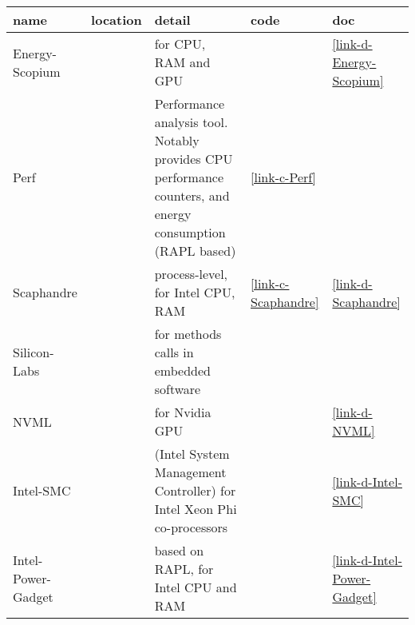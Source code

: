 \begin{tabular}{|>{\raggedright\arraybackslash}p{3.25cm}|p{1.25cm}|p{6.7cm}|p{1.5cm}|p{1.5cm}|}
\toprule
name & location & detail & code & doc \\
\midrule
Energy-Scopium & \cite{jay2023} & for CPU, RAM and GPU &  &  \href{https://www.denergium.fr/pages/the-energyscopium-software-suite.html}{\ref*{link-d-Energy-Scopium}} \\
Perf & \cite{jay2023} & Performance analysis tool. Notably provides CPU performance counters, and energy consumption (RAPL based) &  \href{https://www.man7.org/linux/man-pages/man1/perf.1.html}{\ref*{link-c-Perf}} &  \\
Scaphandre & \cite{jay2023} & process-level, for Intel CPU, RAM &  \href{https://github.com/hubblo-org/scaphandre}{\ref*{link-c-Scaphandre}} &  \href{https://hubblo-org.github.io/scaphandre-documentation/}{\ref*{link-d-Scaphandre}} \\
Silicon-Labs & \cite{rieger2017} & for methods calls in embedded software &  &  \\
NVML & \cite{fahad2019} & for Nvidia GPU &  &  \href{https://developer.nvidia.com/nvidia-system-management-interface}{\ref*{link-d-NVML}} \\
Intel-SMC & \cite{fahad2019} & (Intel System Management Controller) for Intel Xeon Phi co-processors &  &  \href{https://www.intel.com/content/dam/develop/external/us/en/documents/xeon-phi-coprocessor-system-software-developers-guide.pdf}{\ref*{link-d-Intel-SMC}} \\
Intel-Power-Gadget & \cite{garcia-martin2019a} & based on RAPL, for Intel CPU and RAM &  &  \href{https://www.intel.com/content/www/us/en/developer/articles/tool/power-gadget.html}{\ref*{link-d-Intel-Power-Gadget}} \\
\bottomrule
\end{tabular}
